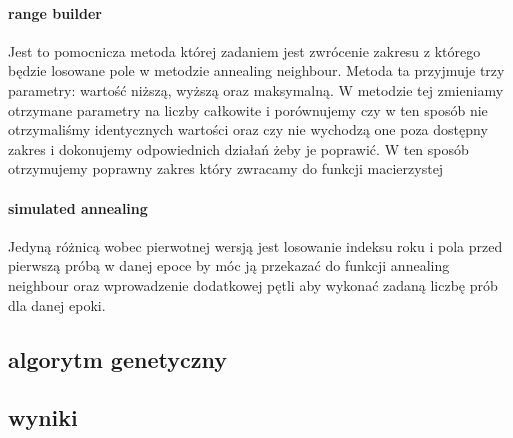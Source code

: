 \documentclass{article}
\begin{document}
 \paragraph{range builder}
 Jest to pomocnicza metoda której zadaniem jest zwrócenie zakresu z którego będzie losowane pole w metodzie annealing neighbour. Metoda ta przyjmuje trzy parametry: wartość niższą, wyższą oraz maksymalną. W metodzie tej zmieniamy otrzymane parametry na liczby całkowite i porównujemy czy w ten sposób nie otrzymaliśmy identycznych wartości oraz czy nie wychodzą one poza dostępny zakres i dokonujemy odpowiednich działań żeby je poprawić. W ten sposób otrzymujemy poprawny zakres który zwracamy do funkcji macierzystej

\paragraph{simulated annealing}
Jedyną różnicą wobec pierwotnej wersją jest losowanie indeksu roku i pola przed pierwszą próbą w danej epoce by móc ją przekazać do funkcji annealing neighbour oraz wprowadzenie dodatkowej pętli aby wykonać zadaną liczbę prób dla danej epoki.

\subsection{algorytm genetyczny}


\subsection{wyniki}
\end{document}
